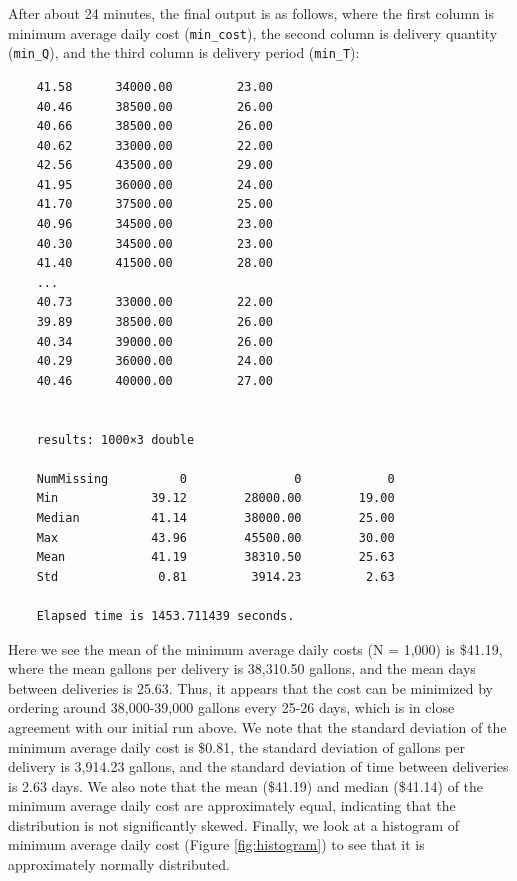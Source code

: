 \documentclass{article}
\begin{document}
    After about 24 minutes, the final output is as follows, where the first column is minimum average daily cost (\texttt{min\_cost}), the second column is delivery quantity (\texttt{min\_Q}), and the third column is delivery period (\texttt{min\_T}):

    \begin{verbatim}
    41.58      34000.00         23.00
    40.46      38500.00         26.00
    40.66      38500.00         26.00
    40.62      33000.00         22.00
    42.56      43500.00         29.00
    41.95      36000.00         24.00
    41.70      37500.00         25.00
    40.96      34500.00         23.00
    40.30      34500.00         23.00
    41.40      41500.00         28.00
    ...
    40.73      33000.00         22.00
    39.89      38500.00         26.00
    40.34      39000.00         26.00
    40.29      36000.00         24.00
    40.46      40000.00         27.00


    results: 1000×3 double

    NumMissing          0               0            0
    Min             39.12        28000.00        19.00
    Median          41.14        38000.00        25.00
    Max             43.96        45500.00        30.00
    Mean            41.19        38310.50        25.63
    Std              0.81         3914.23         2.63

    Elapsed time is 1453.711439 seconds.\end{verbatim}
    \pagebreak
    Here we see the mean of the minimum average daily costs (N = 1,000) is \$41.19, where the mean gallons per delivery is 38,310.50 gallons, and the mean days between deliveries is 25.63. Thus, it appears that the cost can be minimized by ordering around 38,000-39,000 gallons every 25-26 days, which is in close agreement with our initial run above. We note that the standard deviation of the minimum average daily cost is \$0.81, the standard deviation of gallons per delivery is 3,914.23 gallons, and the standard deviation of time between deliveries is 2.63 days. We also note that the mean (\$41.19) and median (\$41.14) of the minimum average daily cost are approximately equal, indicating that the distribution is not significantly skewed. Finally, we look at a histogram of minimum average daily cost (Figure \ref{fig:histogram}) to see that it is approximately normally distributed.
\end{document}
